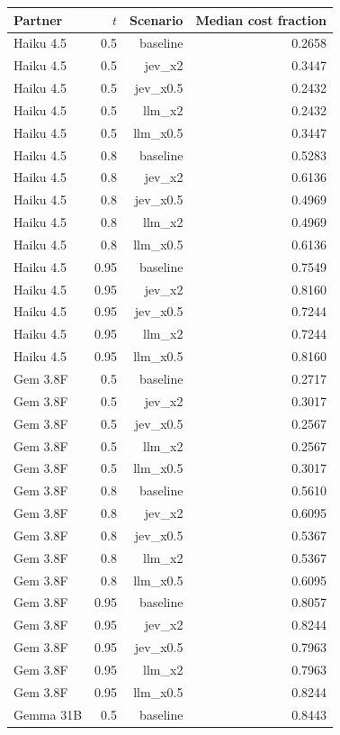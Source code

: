 \begin{tabular}{lrrr}
\toprule
Partner & $t$ & Scenario & Median cost fraction \\
\midrule
Haiku 4.5 & 0.5 & baseline & 0.2658 \\
Haiku 4.5 & 0.5 & jev\_x2 & 0.3447 \\
Haiku 4.5 & 0.5 & jev\_x0.5 & 0.2432 \\
Haiku 4.5 & 0.5 & llm\_x2 & 0.2432 \\
Haiku 4.5 & 0.5 & llm\_x0.5 & 0.3447 \\
Haiku 4.5 & 0.8 & baseline & 0.5283 \\
Haiku 4.5 & 0.8 & jev\_x2 & 0.6136 \\
Haiku 4.5 & 0.8 & jev\_x0.5 & 0.4969 \\
Haiku 4.5 & 0.8 & llm\_x2 & 0.4969 \\
Haiku 4.5 & 0.8 & llm\_x0.5 & 0.6136 \\
Haiku 4.5 & 0.95 & baseline & 0.7549 \\
Haiku 4.5 & 0.95 & jev\_x2 & 0.8160 \\
Haiku 4.5 & 0.95 & jev\_x0.5 & 0.7244 \\
Haiku 4.5 & 0.95 & llm\_x2 & 0.7244 \\
Haiku 4.5 & 0.95 & llm\_x0.5 & 0.8160 \\
Gem 3.8F & 0.5 & baseline & 0.2717 \\
Gem 3.8F & 0.5 & jev\_x2 & 0.3017 \\
Gem 3.8F & 0.5 & jev\_x0.5 & 0.2567 \\
Gem 3.8F & 0.5 & llm\_x2 & 0.2567 \\
Gem 3.8F & 0.5 & llm\_x0.5 & 0.3017 \\
Gem 3.8F & 0.8 & baseline & 0.5610 \\
Gem 3.8F & 0.8 & jev\_x2 & 0.6095 \\
Gem 3.8F & 0.8 & jev\_x0.5 & 0.5367 \\
Gem 3.8F & 0.8 & llm\_x2 & 0.5367 \\
Gem 3.8F & 0.8 & llm\_x0.5 & 0.6095 \\
Gem 3.8F & 0.95 & baseline & 0.8057 \\
Gem 3.8F & 0.95 & jev\_x2 & 0.8244 \\
Gem 3.8F & 0.95 & jev\_x0.5 & 0.7963 \\
Gem 3.8F & 0.95 & llm\_x2 & 0.7963 \\
Gem 3.8F & 0.95 & llm\_x0.5 & 0.8244 \\
Gemma 31B & 0.5 & baseline & 0.8443 \\

\end{tabular}
